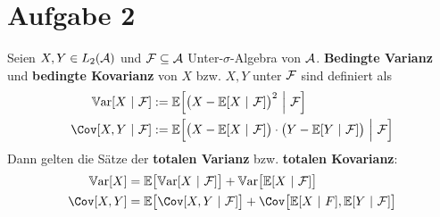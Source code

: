\documentclass[12pt,a4paper]{article}
\begin{document}
\section*{Aufgabe 2}
Seien $X,Y\in L_2(\mathcal{A})$ und $\mathcal{F}\subseteq\mathcal{A}$ Unter-$\sigma$-Algebra von $\mathcal{A}$. \textbf{Bedingte Varianz} und \textbf{bedingte Kovarianz} von $X$ bzw. $X,Y$ unter $\mathcal{F}$ sind definiert als
\begin{align*}
\Var[X~|~\F]&:=\E\Big[\big(X-\E[X~|~\F]\big)^2~\Big|~\F\Big]\\
\Cov[X,Y~|~\F]&:=\E\Big[\big(X-\E[X~|~\F]\big)\cdot\big(Y-\E[Y~|~\F]\big)~\Big|~\F\Big]
\end{align*}
Dann gelten die Sätze der \textbf{totalen Varianz} bzw. \textbf{totalen Kovarianz}:
\begin{align*}
\Var[X]&=\E\big[\Var[X~|~\F]\big]+\Var\big[\E[X~|~\F]\big]\\
\Cov[X,Y]&=\E\big[\Cov[X,Y~|~\F]\big]+\Cov\big[\E[X~|~F],\E[Y~|~\F]\big]
\end{align*}
\end{document}
